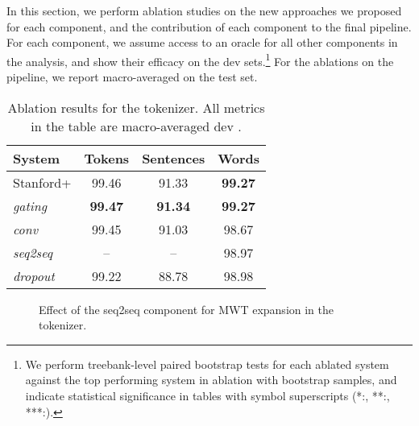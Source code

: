 \documentclass[11pt,a4paper]{article}
\newcommand{\fone}{}
\begin{document}
In this section, we perform ablation studies on the new approaches we proposed for each component, and the contribution of each component to the final pipeline.
For each component, we assume access to an oracle for all other components in the analysis, and show their efficacy on the dev sets.\footnote{We perform treebank-level paired bootstrap tests for each ablated system against the top performing system in ablation with  bootstrap samples, and indicate statistical significance in tables with symbol superscripts (*:, **:, ***:).}
For the ablations on the pipeline, we report macro-averaged \fone{} on the test set.

\begin{table}
\centering
\small
\begin{tabular}{lccc}
\toprule
System & Tokens & Sentences & Words \\
\midrule
Stanford+ & 99.46 & 91.33 & \textbf{99.27} \\
 \textit{gating} & \textbf{99.47} & \textbf{91.34} & \textbf{99.27}\\
 \textit{conv} & 99.45 & 91.03 & 98.67\\
 \textit{seq2seq} & -- & -- & 98.97\\
 \textit{dropout} & 99.22 & 88.78 & 98.98\\
\bottomrule
\end{tabular}
\caption{Ablation results for the tokenizer. All metrics in the table are macro-averaged dev \fone{}.} \label{tab:tok_ablation}
\end{table}

\begin{figure}
    \centering
    \setlength{\abovecaptionskip}{-4pt}
         \caption{Effect of the seq2seq component for MWT expansion in the tokenizer.}\label{fig:tok_seq2seq}
\end{figure}
\end{document}
